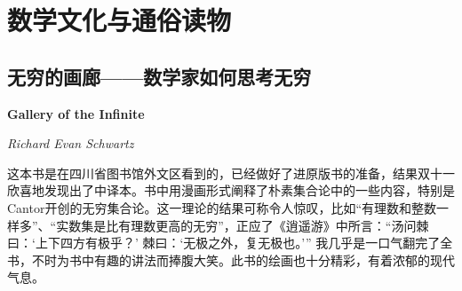 
\section{数学文化与通俗读物}
\subsection*{无穷的画廊——数学家如何思考无穷}
\par \textbf{Gallery of the Infinite}
\par \emph{Richard Evan Schwartz} 
\par 这本书是在四川省图书馆外文区看到的，已经做好了进原版书的准备，结果双十一欣喜地发现出了中译本。书中用漫画形式阐释了朴素集合论中的一些内容，特别是Cantor开创的无穷集合论。这一理论的结果可称令人惊叹，比如“有理数和整数一样多”、“实数集是比有理数更高的无穷”，正应了《逍遥游》中所言：“汤问棘曰：‘上下四方有极乎？’ 棘曰：‘无极之外，复无极也。’” 我几乎是一口气翻完了全书，不时为书中有趣的讲法而捧腹大笑。此书的绘画也十分精彩，有着浓郁的现代气息。
\par {}
